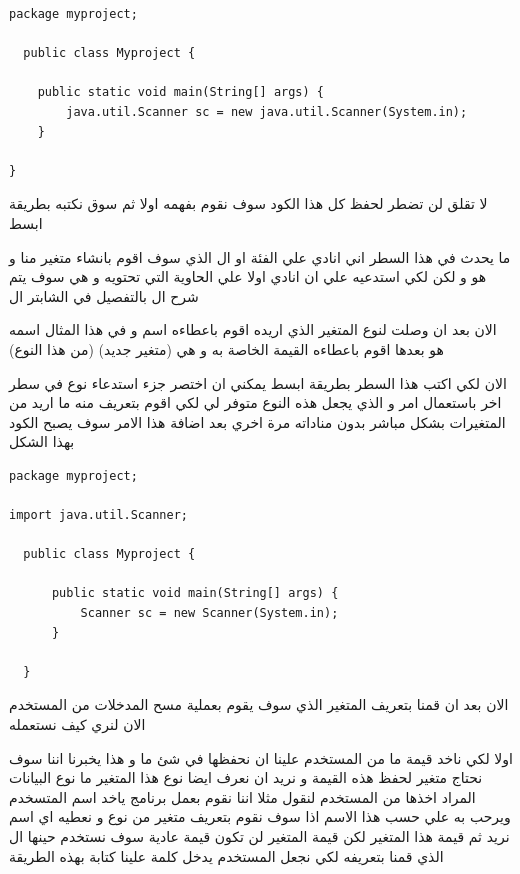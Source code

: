 \begin{verbatim}
package myproject;
  
  public class Myproject {

    public static void main(String[] args) {
        java.util.Scanner sc = new java.util.Scanner(System.in);
    }
    
}
\end{verbatim}
\begin{AR}
  لا تقلق لن تضطر لحفظ كل هذا الكود سوف نقوم بفهمه اولا ثم سوق نكتبه بطريقة ابسط 

  ما يحدث في هذا السطر اني انادي علي الفئة او ال الذي سوف اقوم بانشاء متغير منا و هو  و لكن لكي استدعيه علي ان 
  انادي اولا علي الحاوية التي تحتويه و هي  سوف يتم شرح ال  بالتفصيل في الشابتر ال

  الان بعد ان وصلت لنوع المتغير الذي اريده اقوم باعطاءه اسم و في هذا المثال اسمه هو  بعدها اقوم
  باعطاءه القيمة الخاصة به و هي  (متغير جديد)  (من هذا النوع)

  الان لكي اكتب هذا السطر بطريقة ابسط يمكني ان اختصر جزء استدعاء نوع  في سطر اخر باستعمال امر  و الذي يجعل هذه النوع متوفر لي لكي اقوم بتعريف منه ما اريد من المتغيرات بشكل مباشر بدون مناداته مرة اخري
  بعد اضافة هذا الامر سوف يصبح الكود بهذا الشكل 
\end{AR}
\begin{verbatim}
package myproject;

import java.util.Scanner;

  public class Myproject {

      public static void main(String[] args) {
          Scanner sc = new Scanner(System.in);
      }
      
  }
\end{verbatim}
\begin{AR}
  الان بعد ان قمنا بتعريف المتغير الذي سوف يقوم بعملية مسح المدخلات من المستخدم الان لنري كيف نستعمله

  اولا لكي ناخد قيمة ما من المستخدم علينا ان نحفظها في شئ ما  و هذا يخبرنا اننا سوف نحتاج متغير لحفظ هذه القيمة و نريد ان نعرف ايضا نوع هذا المتغير 
  ما نوع البيانات المراد اخذها من المستخدم لنقول مثلا اننا نقوم بعمل برنامج ياخد اسم المتسخدم ويرحب به علي حسب هذا الاسم اذا سوف نقوم بتعريف 
  متغير من نوع  و نعطيه اي اسم نريد ثم قيمة هذا المتغير لكن قيمة المتغير لن تكون قيمة 
  عادية سوف نستخدم حينها ال  الذي قمنا بتعريفه لكي نجعل المستخدم يدخل كلمة علينا كتابة
   بهذه الطريقة 
\end{AR}
